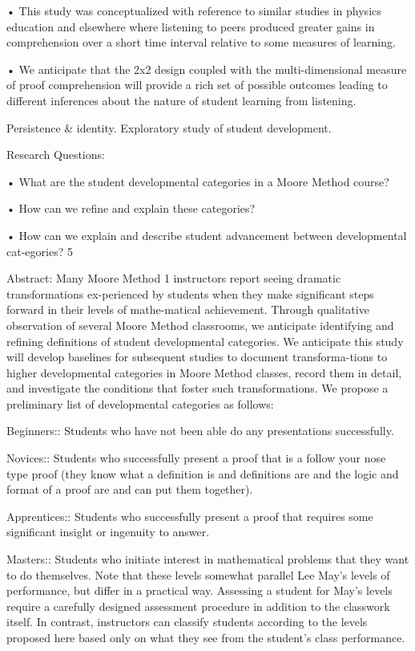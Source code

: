 \documentclass[11pt]{article}
\begin{document}
• This study was conceptualized with reference to similar studies in physics education and elsewhere where listening to peers produced greater gains in comprehension over a short time interval relative to some measures of learning.

• We anticipate that the 2x2 design coupled with the multi-dimensional measure of proof comprehension will provide a rich set of possible outcomes leading to different inferences about the nature of student learning from listening.

Persistence \& identity. Exploratory study of student development.

Research Questions:

• What are the student developmental categories in a Moore Method course?

• How can we refine and explain these categories?

• How can we explain and describe student advancement between developmental cat-egories? 5

Abstract: Many Moore Method 1 instructors report seeing dramatic transformations ex-perienced by students when they make significant steps forward in their levels of mathe-matical achievement. Through qualitative observation of several Moore Method classrooms, we anticipate identifying and refining definitions of student developmental categories. We anticipate this study will develop baselines for subsequent studies to document transforma-tions to higher developmental categories in Moore Method classes, record them in detail, and investigate the conditions that foster such transformations. We propose a preliminary list of developmental categories as follows:

Beginners:: Students who have not been able do any presentations successfully.

Novices:: Students who successfully present a proof that is a follow your nose type proof (they know what a definition is and definitions are and the logic and format of a proof are and can put them together).

Apprentices:: Students who successfully present a proof that requires some significant insight or ingenuity to answer.

Masters:: Students who initiate interest in mathematical problems that they want to do themselves. Note that these levels somewhat parallel Lee May's levels of performance, but differ in a practical way. Assessing a student for May's levels require a carefully designed assessment procedure in addition to the classwork itself. In contrast, instructors can classify students according to the levels proposed here based only on what they see from the student's class performance.
\end{document}
